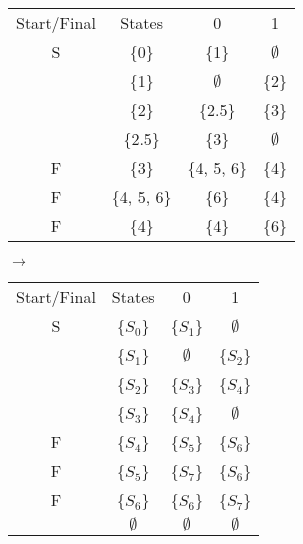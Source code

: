 \documentclass[12pt]{article}
\begin{document}
\begin{minipage}{.5\linewidth}
    \begin{tabular}{cc|c|c}
        Start/Final & States & 0 & 1 \\
        S & \{0\} & \{1\} & \(\emptyset\) \\
        & \{1\} & \(\emptyset\) & \{2\} \\
        & \{2\} & \{2.5\} & \{3\} \\
        & \{2.5\} & \{3\} & \(\emptyset\) \\
        F & \{3\} & \{4, 5, 6\} & \{4\} \\
        F & \{4, 5, 6\} & \{6\} & \{4\} \\
        F & \{4\} & \{4\} & \{6\}
    \end{tabular}        
\end{minipage}
\(\rightarrow\)
\begin{minipage}{.5\linewidth}
    \begin{tabular}{cc|c|c}
        Start/Final & States & 0 & 1 \\
        S & \{\(S_0\)\} & \{\(S_1\)\} & \(\emptyset\) \\
        & \{\(S_1\)\} & \(\emptyset\) & \{\(S_2\)\} \\
        & \{\(S_2\)\} & \{\(S_3\)\} & \{\(S_4\)\} \\
        & \{\(S_3\)\} & \{\(S_4\)\} & \(\emptyset\) \\
        F & \{\(S_4\)\} & \{\(S_5\)\} & \{\(S_6\)\} \\
        F & \{\(S_5\)\} & \{\(S_7\)\} & \{\(S_6\)\} \\
        F & \{\(S_6\)\} & \{\(S_6\)\} & \{\(S_7\)\} \\
        & \(\emptyset\) & \(\emptyset\) & \(\emptyset\) 
    \end{tabular}
\end{minipage}
\end{document}
